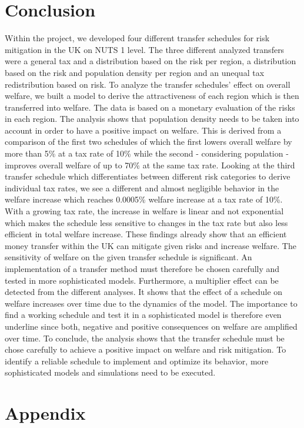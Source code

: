 \documentclass[10pt,a4paper]{article}
\begin{document}
\section{Conclusion}
Within the project, we developed four different transfer schedules for risk mitigation in the UK on NUTS 1 level. The three different analyzed transfers were a general tax and a distribution based on the risk per region, a distribution based on the risk and population density per region and an unequal tax redistribution based on risk. 
To analyze the transfer schedules' effect on overall welfare, we built a model to derive the attractiveness of each region which is then transferred into welfare. The data is based on a monetary evaluation of the risks in each region. 
The analysis shows that population density needs to be taken into account in order to have a positive impact on welfare. This is derived from a comparison of the first two schedules of which the first lowers overall welfare by more than 5\% at a tax rate of 10\% while the second - considering population - improves overall welfare of up to 70\% at the same tax rate. Looking at the third transfer schedule which differentiates between different risk categories to derive individual tax rates, we see a different and almost negligible behavior in the welfare increase which reaches 0.0005\% welfare increase at a tax rate of 10\%. With a growing tax rate, the increase in welfare is linear and not exponential which makes the schedule less sensitive to changes in the tax rate but also less efficient in total welfare increase. These findings already show that an efficient money transfer within the UK can mitigate given risks and increase welfare. The sensitivity of welfare on the given transfer schedule is significant. An implementation of a transfer method must therefore be chosen carefully and tested in more sophisticated models. Furthermore, a multiplier effect can be detected from the different analyses. It shows that the effect of a schedule on welfare increases over time due to the dynamics of the model. The importance to find a working schedule and test it in a sophisticated model is therefore even underline since both, negative and positive consequences on welfare are amplified over time.
To conclude, the analysis shows that the transfer schedule must be chose carefully to achieve a positive impact on welfare and risk mitigation. To identify a reliable schedule to implement and optimize its behavior, more sophisticated models and simulations need to be executed.
\newpage
\section{Appendix}
\end{document}

